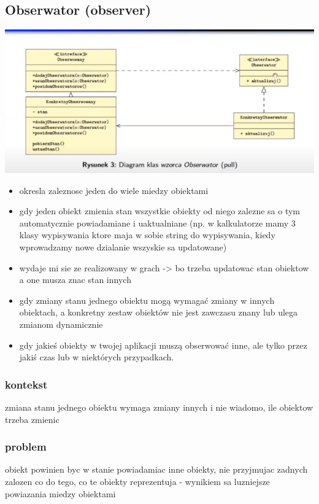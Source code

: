 \documentclass[11pt]{article}
\begin{document}
\subsection{Obserwator (observer)}
\label{sec:org6a74b60}
\begin{center}
\includegraphics[width=.9\linewidth]{./obserwator.png}
\end{center}
\begin{itemize}
\item okresla zaleznosc jeden do wiele miedzy obiektami
\item gdy jeden obiekt zmienia stan wszystkie obiekty od niego zalezne sa o tym automatycznie powiadamiane i uaktualniane (np. w kalkulatorze mamy 3 klasy wypisywania ktore maja w sobie string do wypisywania, kiedy wprowadzamy nowe dzialanie wszyskie sa updatowane)
\item wydaje mi sie ze realizowany w grach -> bo trzeba updatowac stan obiektow a one musza znac stan innych
\item gdy zmiany stanu jednego obiektu mogą wymagać zmiany w innych obiektach, a konkretny zestaw obiektów nie jest zawczasu znany lub ulega zmianom dynamicznie
\item gdy jakieś obiekty w twojej aplikacji muszą obserwować inne, ale tylko przez jakiś czas lub w niektórych przypadkach.
\end{itemize}
\subsubsection{kontekst}
\label{sec:orga23ea35}
zmiana stanu jednego obiektu wymaga zmiany innych i nie wiadomo, ile obiektow trzeba zmienic
\subsubsection{problem}
\label{sec:org7fe517a}
obiekt powinien byc w stanie powiadamiac inne obiekty, nie przyjmujac zadnych zalozen co do tego, co te obiekty reprezentuja - wynikiem sa luzniejsze powiazania miedzy obiektami
\end{document}
